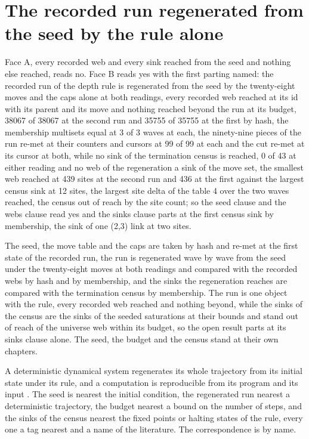 \section{The recorded run regenerated from the seed by the rule alone}\label{mod:X-12-D545732-w-rgse}
\begin{chwall}
Face A, every recorded web and every sink reached from the seed and nothing else reached, reads no. Face B reads yes with the first parting named: the recorded run of the depth rule is regenerated from the seed by the twenty-eight moves and the caps alone at both readings, every recorded web reached at its id with its parent and its move and nothing reached beyond the run at its budget, 38067 of 38067 at the second run and 35755 of 35755 at the first by hash, the membership multisets equal at 3 of 3 waves at each, the ninety-nine pieces of the run re-met at their counters and cursors at 99 of 99 at each and the cut re-met at its cursor at both, while no sink of the termination census is reached, 0 of 43 at either reading and no web of the regeneration a sink of the move set, the smallest web reached at 439 sites at the second run and 436 at the first against the largest census sink at 12 sites, the largest site delta of the table 4 over the two waves reached, the census out of reach by the site count; so the seed clause and the webs clause read yes and the sinks clause parts at the first census sink by membership, the sink of one (2,3) link at two sites.
\end{chwall}
\chdeps{}{}
The seed, the move table and the caps are taken by hash and re-met at the first state of the recorded run, the run is regenerated wave by wave from the seed under the twenty-eight moves at both readings and compared with the recorded webs by hash and by membership, and the sinks the regeneration reaches are compared with the termination census by membership. The run is one object with the rule, every recorded web reached and nothing beyond, while the sinks of the census are the sinks of the seeded saturations at their bounds and stand out of reach of the universe web within its budget, so the open result parts at its sinks clause alone. The seed, the budget and the census stand at their own chapters.
\begin{chbridge}
A deterministic dynamical system regenerates its whole trajectory from its initial state under its rule, and a computation is reproducible from its program and its input \cite{Turing1937,Wolfram2002}. The seed is nearest the initial condition, the regenerated run nearest a deterministic trajectory, the budget nearest a bound on the number of steps, and the sinks of the census nearest the fixed points or halting states of the rule, every one a tag nearest and a name of the literature. The correspondence is by name.
\end{chbridge}
